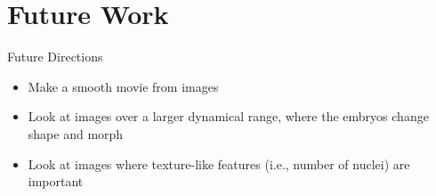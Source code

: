 \documentclass[10pt]{beamer}
\begin{document}
\section{Future Work}

\begin{frame}{Future Directions}

\begin{itemize}
\item Make a smooth movie from images
\item Look at images over a larger dynamical range, where the embryos change shape and morph
\item Look at images where texture-like features (i.e., number of nuclei) are important
\end{itemize}
\end{frame}
\end{document}

